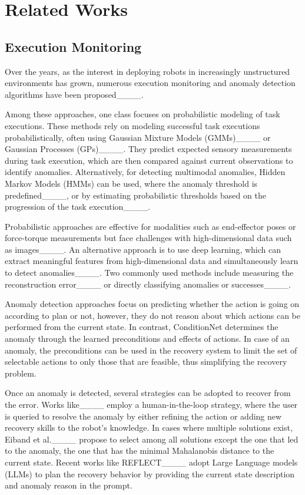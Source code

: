 \section{Related Works}
\subsection{Execution Monitoring}
Over the years, as the interest in deploying robots in increasingly unstructured environments has grown, numerous execution monitoring and anomaly detection algorithms have been proposed____.

Among these approaches, one class focuses on probabilistic modeling of task executions. These methods rely on modeling successful task executions probabilistically, often using Gaussian Mixture Models (GMMs)____ or Gaussian Processes (GPs)____. They predict expected sensory measurements during task execution, which are then compared against current observations to identify anomalies. Alternatively, for detecting multimodal anomalies, Hidden Markov Models (HMMs) can be used, where the anomaly threshold is predefined____, or by estimating probabilistic thresholds based on the progression of the task execution____.

Probabilistic approaches are effective for modalities such as end-effector poses or force-torque measurements but face challenges with high-dimensional data such as images____. An alternative approach is to use deep learning, which can extract meaningful features from high-dimensional data and simultaneously learn to detect anomalies____. Two commonly used methods include measuring the reconstruction error____ or directly classifying anomalies or successes____.

Anomaly detection approaches focus on predicting whether the action is going on according to plan or not, however, they do not reason about which actions can be performed from the current state. In contrast, ConditionNet determines the anomaly through the learned preconditions and effects of actions. In case of an anomaly, the preconditions can be used in the recovery system to limit the set of selectable actions to only those that are feasible, thus simplifying the recovery problem.

Once an anomaly is detected, several strategies can be adopted to recover from the error. Works like____ employ a human-in-the-loop strategy, where the user is queried to resolve the anomaly by either refining the action or adding new recovery skills to the robot's knowledge. In cases where multiple solutions exist, Eiband et al.____ propose to select among all solutions except the one that led to the anomaly, the one that has the minimal Mahalanobis distance to the current state. Recent works like REFLECT____ adopt Large Language models (LLMs) to plan the recovery behavior by providing the current state description and anomaly reason in the prompt.

